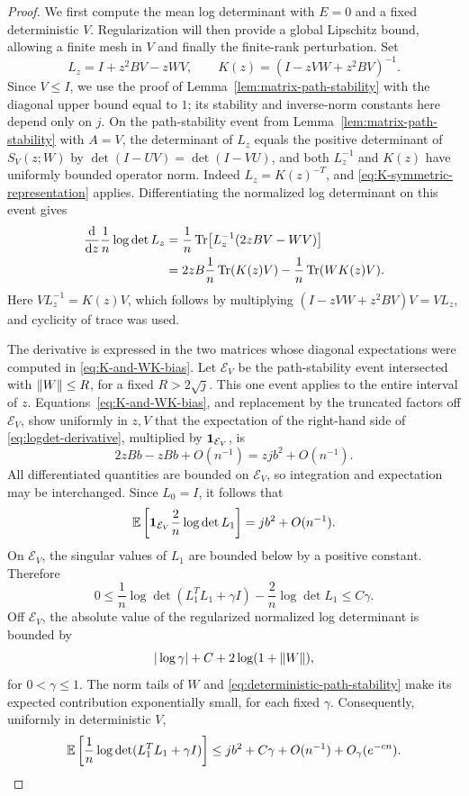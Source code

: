 \begin{proof}
We first compute the mean log determinant with $E=0$ and a fixed
deterministic $V$.  Regularization will then provide a global
Lipschitz bound, allowing a finite mesh in $V$ and finally the
finite-rank perturbation.  Set
\[
 L_z=I+z^2BV-zWV,
 \qquad K(z)=(I-zVW+z^2BV)^{-1}.
\]
Since $V\le I$, we use the proof of
Lemma~\ref{lem:matrix-path-stability} with the diagonal upper bound
equal to $1$; its stability and inverse-norm constants here depend
only on $j$.
On the path-stability event from
Lemma~\ref{lem:matrix-path-stability} with $A=V$, the determinant
of $L_z$ equals the positive determinant of $S_V(z;W)$ by
$\det(I-UV)=\det(I-VU)$, and both
$L_z^{-1}$ and $K(z)$ have uniformly bounded operator norm.
Indeed $L_z=K(z)^{-T}$, and
\eqref{eq:K-symmetric-representation} applies.  Differentiating
the normalized log determinant on this event gives
\begin{align}
 \frac{\mathrm d}{\mathrm d z}\frac1n\log\det L_z
 &=\frac1n\operatorname{Tr}\bigl[L_z^{-1}(2zBV-WV)\bigr]\notag\\
 &=2zB\frac1n\operatorname{Tr}(K(z)V)
      -\frac1n\operatorname{Tr}(WK(z)V).
 \label{eq:logdet-derivative}
\end{align}
Here $VL_z^{-1}=K(z)V$, which follows by multiplying
$(I-zVW+z^2BV)V=V L_z$, and cyclicity of trace was used.

The derivative is expressed in the two matrices whose diagonal
expectations were computed in \eqref{eq:K-and-WK-bias}.
Let $\mathcal E_V$ be the path-stability event intersected with
$\lVert W\rVert\le R$, for a fixed $R>2\sqrt j$.  This one event applies
to the entire interval of $z$.  Equations~\eqref{eq:K-and-WK-bias}, and
replacement by the truncated factors off $\mathcal E_V$, show
uniformly in $z,V$ that the expectation of the right-hand side
of \eqref{eq:logdet-derivative}, multiplied by
$\mathbf 1_{\mathcal E_V}$, is
\[
 2zBb-zBb+O(n^{-1})=zjb^2+O(n^{-1}).
\]
All differentiated quantities are bounded on $\mathcal E_V$,
so integration and expectation may be interchanged.  Since
$L_0=I$, it follows that
\begin{equation}\label{eq:unregularized-logdet-mean}
 \mathbb E\left[\mathbf 1_{\mathcal E_V}\frac2n\log\det L_1\right]
 =jb^2+O(n^{-1}).
\end{equation}
On $\mathcal E_V$, the singular values of $L_1$ are bounded
below by a positive constant.  Therefore
\[
 0\le\frac1n\log\det(L_1^TL_1+\gamma I)
       -\frac2n\log\det L_1
 \le C\gamma.
\]
Off $\mathcal E_V$, the absolute value of the regularized
normalized log determinant is bounded by
\[
 |\log\gamma|+C+2\log(1+\lVert W\rVert),
\]
for $0<\gamma\le1$.  The norm tails of $W$ and
\eqref{eq:deterministic-path-stability} make its expected
contribution exponentially small, for each fixed $\gamma$.
Consequently, uniformly in deterministic $V$,
\begin{equation}\label{eq:regularized-logdet-mean}
 \mathbb E\left[\frac1n\log\det(L_1^TL_1+\gamma I)\right]
 \le jb^2+C\gamma+O(n^{-1})+O_\gamma(e^{-c n}).
\end{equation}


\end{proof}
